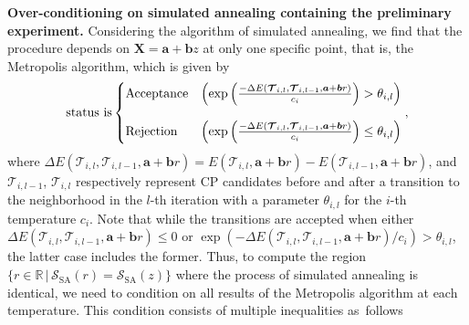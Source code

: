 \textbf{Over-conditioning on simulated annealing containing the preliminary experiment.}
Considering the algorithm of simulated annealing, we find that the procedure depends on $\bm{X} = \bm{a} + \bm{b}z$ at only one specific point, that is, the Metropolis algorithm, %
which is given by
\begin{equation}
  \text{status is}
  \begin{cases}
    \text{Acceptance} & \left(\exp\left(\frac{-\Delta E(\bm{\mathcal{T}}_{i,l}, \bm{\mathcal{T}}_{i,l-1}, \bm{a} + \bm{b}r)}{c_i}\right) > \theta_{i,l}\right) \\
    \vspace{-1mm}\\
    \text{Rejection} & \left(\exp\left(\frac{-\Delta E(\bm{\mathcal{T}}_{i,l}, \bm{\mathcal{T}}_{i,l-1}, \bm{a} + \bm{b}r)}{c_i}\right) \leq \theta_{i,l}\right)
  \end{cases}, \notag
\end{equation}
where $\Delta E(\bm{\mathcal{T}}_{i,l}, \bm{\mathcal{T}}_{i,l-1}, \bm{a} + \bm{b}r) = E(\bm{\mathcal{T}}_{i,l}, \bm{a} + \bm{b}r) - E(\bm{\mathcal{T}}_{i,l-1}, \bm{a} + \bm{b}r)$, 
and $\bm{\mathcal{T}}_{i,l-1}$, $\bm{\mathcal{T}}_{i,l}$ respectively represent CP candidates before and after a transition to the neighborhood 
in the $l$-th iteration with a parameter $\theta_{i,l}$ for the $i$-th temperature $c_i$. 
Note that while the transitions are accepted when either $\Delta E(\bm{\mathcal{T}}_{i,l}, \bm{\mathcal{T}}_{i,l-1}, \bm{a} + \bm{b}r) \leq 0$ or $\exp(-\Delta E(\bm{\mathcal{T}}_{i,l}, \bm{\mathcal{T}}_{i,l-1}, \bm{a} + \bm{b}r) /c_i) > \theta_{i,l}$, 
the latter case includes the former. 
Thus, to compute the region $\{r \in \mathbb{R} \, | \, \mathcal{S}_{\text{SA}}(r) = \mathcal{S}_{\text{SA}}(z)\}$ where the process of simulated annealing is identical, 
we need to condition on all results of the Metropolis algorithm at each temperature.
This condition consists of multiple inequalities as~follows
